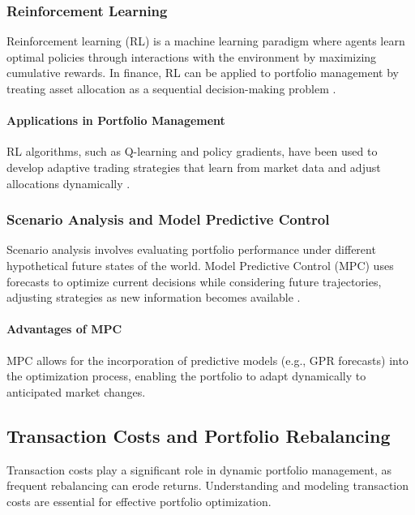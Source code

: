 \subsubsection{Reinforcement Learning}

Reinforcement learning (RL) is a machine learning paradigm where agents learn optimal policies through interactions with the environment by maximizing cumulative rewards. In finance, RL can be applied to portfolio management by treating asset allocation as a sequential decision-making problem \cite{moody1998performance}.

\paragraph{Applications in Portfolio Management}

RL algorithms, such as Q-learning and policy gradients, have been used to develop adaptive trading strategies that learn from market data and adjust allocations dynamically \cite{almahdi2019adaptive}.

\subsubsection{Scenario Analysis and Model Predictive Control}

Scenario analysis involves evaluating portfolio performance under different hypothetical future states of the world. Model Predictive Control (MPC) uses forecasts to optimize current decisions while considering future trajectories, adjusting strategies as new information becomes available \cite{primbs2009dynamic}.

\paragraph{Advantages of MPC}

MPC allows for the incorporation of predictive models (e.g., GPR forecasts) into the optimization process, enabling the portfolio to adapt dynamically to anticipated market changes.

\subsection{Transaction Costs and Portfolio Rebalancing}

Transaction costs play a significant role in dynamic portfolio management, as frequent rebalancing can erode returns. Understanding and modeling transaction costs are essential for effective portfolio optimization.

